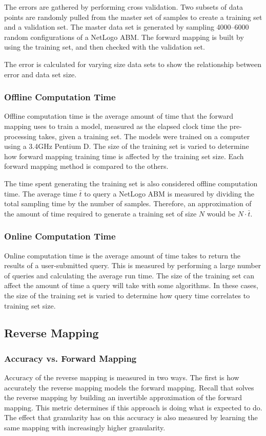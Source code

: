 The errors are gathered by performing cross validation.
Two subsets of data points are randomly pulled from the master set of samples to create a training set and a validation set.
The master data set is generated by sampling 4000--6000 random configurations of a NetLogo ABM.
The forward mapping is built by using the training set, and then checked with the validation set.

The error is calculated for varying size data sets to show the relationship between error and data set size.

  \subsubsection{Offline Computation Time}

Offline computation time is the average amount of time that the forward mapping uses to train a model, measured as the elapsed clock time the pre-processing takes, given a training set.
The models were trained on a computer using a 3.4GHz Pentium D.
The size of the training set is varied to determine how forward mapping training time is affected by the training set size.
Each forward mapping method is compared to the others.

The time spent generating the training set is also considered offline computation time.
The average time $\bar t$ to query a NetLogo ABM is measured by dividing the total sampling time by the number of samples.
Therefore, an approximation of the amount of time required to generate a training set of size $N$ would be $N \cdot \bar t$.

  \subsubsection{Online Computation Time}

Online computation time is the average amount of time \fw takes to return the results of a user-submitted query.
This is measured by performing a large number of queries and calculating the average run time.
The size of the training set can affect the amount of time a query will take with some algorithms.
In these cases, the size of the training set is varied to determine how query time correlates to training set size.

 \subsection{Reverse Mapping}

  \subsubsection{Accuracy vs. Forward Mapping}
Accuracy of the reverse mapping is measured in two ways.
The first is how accurately the reverse mapping models the forward mapping.
Recall that \fw solves the reverse mapping by building an invertible approximation of the forward mapping.
This metric determines if this approach is doing what is expected to do.
The effect that granularity has on this accuracy is also measured by learning the same mapping with increasingly higher granularity.

